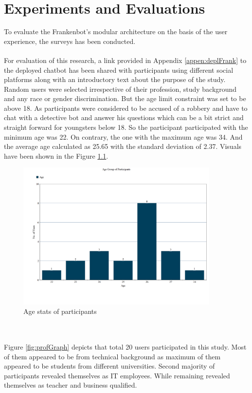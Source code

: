 \chapter{Experiments and Evaluations\label{cha:chapter4}}

To evaluate the Frankenbot's modular architecture on the basis of the user experience, the surveys has been conducted. 
\\~\\
For evaluation of this research, a link provided in Appendix \ref{appen:deplFrank} to the deployed chatbot has been shared with participants using different social platforms along with an introductory text about the purpose of the study. Random users were selected irrespective of their profession, study background and any race or gender discrimination. But the age limit constraint was set to be above 18. As participants were considered to be accused of a robbery and have to chat with a detective bot and answer his questions which can be a bit strict and straight forward for youngsters below 18. So the participant participated with the minimum age was 22. On contrary, the one with the maximum age was 34. And the average age calculated as 25.65 with the standard deviation of 2.37. Visuals have been shown in the Figure \ref{fig:ageGraph}.

\begin{figure}[!h]
    \centering
    \includegraphics[width=0.9\textwidth]{img/Age_Graph_Updated.PNG}
    \caption{Age stats of participants}
    \label{fig:ageGraph}
\end{figure}
\\~\\
Figure \ref{fig:profGraph} depicts that total 20 users participated in this study. Most of them appeared to be from technical background as maximum of them appeared to be students from different universities. Second majority of participants revealed themselves as IT employees. While remaining revealed themselves as teacher and business qualified.

